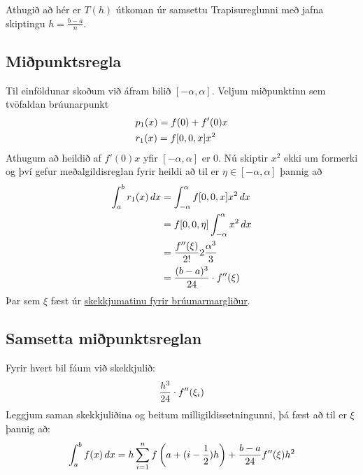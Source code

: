 \documentclass[letterpaper,10pt,icelandic]{sphinxmanual}
\begin{document}
Athugið að hér er \(T(h)\) útkoman úr samsettu Trapisureglunni með jafna
skiptingu \(h = \frac{b-a}n\).


\subsection{Miðpunktsregla}
\label{kafli05:mipunktsregla}
Til einföldunar skoðum við áfram bilið \([-\alpha,\alpha]\). Veljum
miðpunktinn sem tvöfaldan brúunarpunkt
\begin{gather}
\begin{split}\begin{aligned}
  &p_1(x) = f(0) + f'(0)x\\
  &r_1(x) = f[0,0,x]x^2\end{aligned}\end{split}\notag
\end{gather}
Athugum að heildið af \(f'(0)x\) yfir \([-\alpha,\alpha]\) er 0.
Nú skiptir \(x^2\) ekki um formerki og því gefur meðalgildisreglan
fyrir heildi að til er \(\eta \in [-\alpha,\alpha]\) þannig að
\begin{gather}
\begin{split}\begin{aligned}
  \int_a^b r_1(x)\,dx
  &= \int_{-\alpha}^{\alpha} f[0,0,x]x^2 \,dx\\
  &= f[0,0,\eta]\int_{-\alpha}^\alpha x^2\,dx\\
  &= \frac{f''(\xi)}{2!}2\frac{\alpha^3}{3}\\
  &= \frac{(b-a)^3}{24}\cdot f''(\xi)\end{aligned}\end{split}\notag
\end{gather}
Þar sem \(\xi\) fæst úr \href{https://notendur.hi.is/~bsm/stae405/kafli03.html\#id9}{skekkjumatinu fyrir brúunarmargliður}.


\subsection{Samsetta miðpunktsreglan}
\label{kafli05:id6}
Fyrir hvert bil fáum við skekkjulið:
\begin{gather}
\begin{split}\frac{h^3}{24}\cdot f''(\xi_i)\end{split}\notag
\end{gather}
Leggjum saman skekkjuliðina og beitum milligildissetningunni, þá fæst að
til er \(\xi\) þannig að:
\begin{gather}
\begin{split}\int_a^b f(x)\,dx = h \sum_{i=1}^n
  f\left(a+ (i - \frac{1}{2})h\right) + \frac{b-a}{24}f''(\xi)h^2\end{split}\notag
\end{gather}
\end{document}

